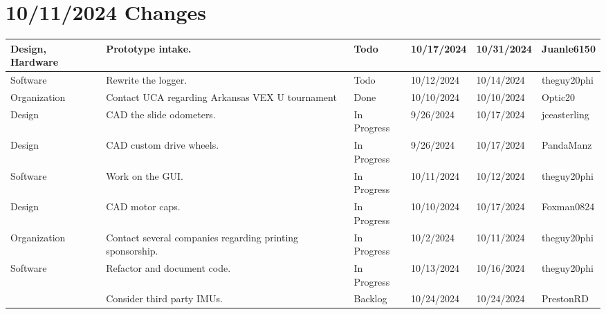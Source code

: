 \section{10/11/2024 Changes}
\begin{center}
\begin{longtable}{| p{40pt} | p{150pt} | p{35pt} | p{33pt} | p{33pt} | p{40pt} |}
\hline \rowcolor{IndianRed1}
Design, Hardware & Prototype intake. & Todo & 10/17/2024 & 10/31/2024 & Juanle6150 \\
\hline \rowcolor{IndianRed1}
Software & Rewrite the logger. & Todo & 10/12/2024 & 10/14/2024 & theguy20phi \\
\hline \rowcolor{DarkSeaGreen1}
Organization & Contact UCA regarding Arkansas VEX U tournament & Done & 10/10/2024 & 10/10/2024 & Optic20 \\
\hline \rowcolor{LightGoldenrod1}
Design & CAD the slide odometers. & In Progress & 9/26/2024 & 10/17/2024 & jceasterling \\
\hline \rowcolor{LightGoldenrod1}
Design & CAD custom drive wheels. & In Progress & 9/26/2024 & 10/17/2024 & PandaManz \\
\hline \rowcolor{LightGoldenrod1}
Software & Work on the GUI. & In Progress & 10/11/2024 & 10/12/2024 & theguy20phi \\
\hline \rowcolor{LightGoldenrod1}
Design & CAD motor caps. & In Progress & 10/10/2024 & 10/17/2024 & Foxman0824 \\
\hline \rowcolor{LightGoldenrod1}
Organization & Contact several companies regarding printing sponsorship. & In Progress & 10/2/2024 & 10/11/2024 & theguy20phi \\
\hline \rowcolor{LightGoldenrod1}
Software & Refactor and document code. & In Progress & 10/13/2024 & 10/16/2024 & theguy20phi \\
\hline \rowcolor{Ivory2}
& Consider third party IMUs. & Backlog & 10/24/2024 & 10/24/2024 & PrestonRD \\
\hline
\end{longtable}
\end{center}


